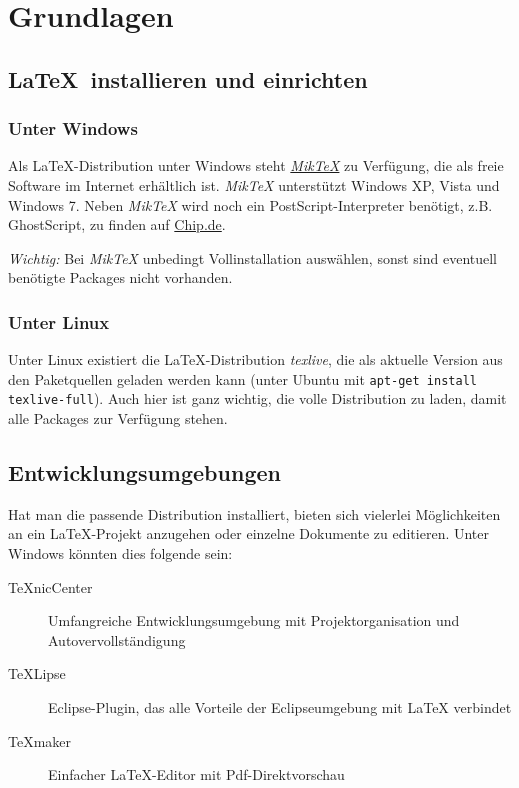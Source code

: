 \chapter{Grundlagen}

\section{\LaTeX\ installieren und einrichten}
\subsection{Unter Windows}

Als LaTeX-Distribution unter Windows steht \href{http://www.miktex.org/}{\textit{MikTeX}} zu Verfügung, die als freie Software im Internet erhältlich ist. 
\textit{MikTeX} unterstützt Windows XP, Vista und Windows 7. Neben \textit{MikTeX} wird noch ein PostScript-Interpreter benötigt, 
z.B. GhostScript, zu finden auf \href{http://www.chip.de}{Chip.de}.

\textit{Wichtig:} Bei \textit{MikTeX} unbedingt Vollinstallation auswählen, sonst sind eventuell benötigte Packages nicht vorhanden.

\subsection{Unter Linux}

Unter Linux existiert die LaTeX-Distribution \textit{texlive}, die als aktuelle Version aus den Paketquellen geladen werden kann (unter Ubuntu mit 
\lstinline{apt-get install texlive-full}). Auch hier ist ganz wichtig, die volle Distribution zu laden, damit alle Packages zur Verfügung stehen.

\section{Entwicklungsumgebungen}

Hat man die passende Distribution installiert, bieten sich vielerlei Möglichkeiten an ein LaTeX-Projekt anzugehen oder einzelne Dokumente zu editieren. Unter
Windows könnten dies folgende sein:

\begin{description}
	\item [TeXnicCenter] Umfangreiche Entwicklungsumgebung mit Projektorganisation und Autovervollständigung
	\item [TeXLipse] Eclipse-Plugin, das alle Vorteile der Eclipseumgebung mit LaTeX verbindet
	\item [TeXmaker] Einfacher LaTeX-Editor mit Pdf-Direktvorschau
\end{description}


